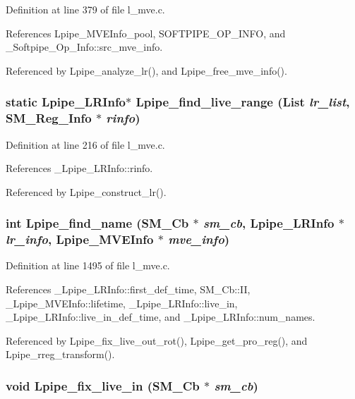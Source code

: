 Definition at line 379 of file l\_\-mve.c.

References Lpipe\_\-MVEInfo\_\-pool, SOFTPIPE\_\-OP\_\-INFO, and \_\-Softpipe\_\-Op\_\-Info::src\_\-mve\_\-info.

Referenced by Lpipe\_\-analyze\_\-lr(), and Lpipe\_\-free\_\-mve\_\-info().
\subsubsection{\setlength{\rightskip}{0pt plus 5cm}static \bf{Lpipe\_\-LRInfo}$\ast$ Lpipe\_\-find\_\-live\_\-range (List {\em lr\_\-list}, \bf{SM\_\-Reg\_\-Info} $\ast$ {\em rinfo})\hspace{0.3cm}{\tt  [static]}}\label{l__mve_8c_b4bea3da2926f660a7ec49c20a4e6eab}




Definition at line 216 of file l\_\-mve.c.

References \_\-Lpipe\_\-LRInfo::rinfo.

Referenced by Lpipe\_\-construct\_\-lr().
\subsubsection{\setlength{\rightskip}{0pt plus 5cm}int Lpipe\_\-find\_\-name (\bf{SM\_\-Cb} $\ast$ {\em sm\_\-cb}, \bf{Lpipe\_\-LRInfo} $\ast$ {\em lr\_\-info}, \bf{Lpipe\_\-MVEInfo} $\ast$ {\em mve\_\-info})}\label{l__mve_8c_be2ad277734a8abfd86d44294fa8983d}




Definition at line 1495 of file l\_\-mve.c.

References \_\-Lpipe\_\-LRInfo::first\_\-def\_\-time, SM\_\-Cb::II, \_\-Lpipe\_\-MVEInfo::lifetime, \_\-Lpipe\_\-LRInfo::live\_\-in, \_\-Lpipe\_\-LRInfo::live\_\-in\_\-def\_\-time, and \_\-Lpipe\_\-LRInfo::num\_\-names.

Referenced by Lpipe\_\-fix\_\-live\_\-out\_\-rot(), Lpipe\_\-get\_\-pro\_\-reg(), and Lpipe\_\-rreg\_\-transform().
\subsubsection{\setlength{\rightskip}{0pt plus 5cm}void Lpipe\_\-fix\_\-live\_\-in (\bf{SM\_\-Cb} $\ast$ {\em sm\_\-cb})}\label{l__mve_8c_b9b475f6cf9c77cd9d0d58f080c0bef5}




